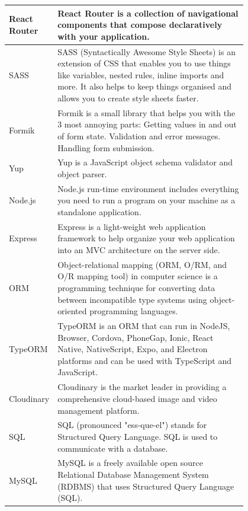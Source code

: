 \documentclass[11pt]{article}
\newcounter{use case ID}
\begin{document}
\begin{table}[H]
\begin{center}
{\begin{tabular}{|l|p{0.8\linewidth}|}
                \index{React Router}React Router & React Router is a collection of navigational components that compose declaratively with your application. \\
                \hline
                \index{SASS}SASS & SASS (Syntactically Awesome Style Sheets) is an extension of CSS that enables you to use things like variables, nested rules, inline imports and more. It also helps to keep things organised and allows you to create style sheets faster. \\
                \hline
                \index{Formik}Formik & Formik is a small library that helps you with the 3 most annoying parts: Getting values in and out of form state. Validation and error messages. Handling form submission. \\
                \hline
                \index{Yup}Yup & Yup is a JavaScript object schema validator and object parser. \\
                \hline
                \index{Node.js}Node.js & Node.js run-time environment includes everything you need to run a program on your machine as a standalone application.\\
                \hline
                \index{Express.js}Express & Express is a light-weight web application framework to help organize your web application into an MVC architecture on the server side. \\
                \hline 
                \index{ORM}ORM & Object-relational mapping (ORM, O/RM, and O/R mapping tool) in computer science is a programming technique for converting data between incompatible type systems using object-oriented programming languages. \\
                \hline
                \index{Typeorm}TypeORM & TypeORM is an ORM that can run in NodeJS, Browser, Cordova, PhoneGap, Ionic, React Native, NativeScript, Expo, and Electron platforms and can be used with TypeScript and JavaScript. \\
                \hline 
                \index{Cloudinary}Cloudinary & Cloudinary is the market leader in providing a comprehensive cloud-based image and video management platform. \\
                \hline
                \index{SQL}SQL & SQL (pronounced "ess-que-el") stands for Structured Query Language. SQL is used to communicate with a database.  \\
                \hline
                \index{MySQL}MySQL & MySQL is a freely available open source Relational Database Management System (RDBMS) that uses Structured Query Language (SQL). \\
                \hline
            \end{tabular}}
    \end{center}
\end{table}
\end{document}
